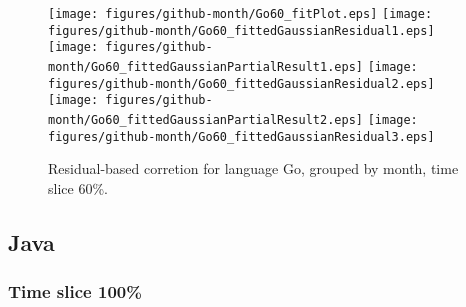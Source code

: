 \begin{figure}[t]
\centering
{}
{\texttt{[image: figures/github-month/Go60\_fitPlot.eps]}}
{\texttt{[image: figures/github-month/Go60\_fittedGaussianResidual1.eps]}}
{\texttt{[image: figures/github-month/Go60\_fittedGaussianPartialResult1.eps]}}
{\texttt{[image: figures/github-month/Go60\_fittedGaussianResidual2.eps]}}
{\texttt{[image: figures/github-month/Go60\_fittedGaussianPartialResult2.eps]}}
{\texttt{[image: figures/github-month/Go60\_fittedGaussianResidual3.eps]}}
\caption{Residual-based corretion for language Go, grouped by month, time slice 60\%.}
\end{figure}


\FloatBarrier


\subsection{Java}

\subsubsection{Time slice 100\%}


